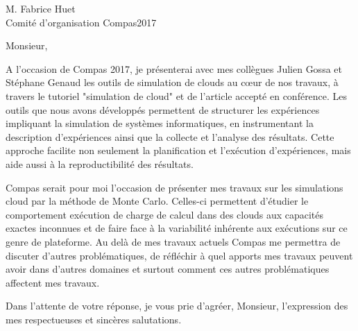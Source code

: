 \documentclass{letter}
\begin{document}
\begin{letter}{M. Fabrice Huet \\ Comité d'organisation Compas2017}

\opening{Monsieur,}

A l'occasion de  Compas 2017, je présenterai avec mes  collègues Julien Gossa et
Stéphane Genaud les outils de simulation de clouds au c\oe{}ur de nos travaux, à
travers le tutoriel "simulation de cloud" et de l'article accepté en conférence.
Les outils  que nous avons  développés permettent de structurer  les expériences
impliquant  la  simulation  de   systèmes  informatiques,  en  instrumentant  la
description   d'expériences   ainsi   que   la   collecte   et   l'analyse   des
résultats. Cette approche facilite non seulement la planification et l'exécution
d'expériences, mais aide aussi à la reproductibilité des résultats.

	Compas serait pour moi l'occasion de présenter mes travaux sur les
	simulations cloud par la méthode de Monte Carlo. Celles-ci permettent
	d'étudier le comportement exécution de charge de calcul dans des clouds
	aux capacités exactes inconnues et de faire face à la variabilité
	inhérente aux exécutions sur ce genre de plateforme. Au delà de mes
	travaux actuels Compas me permettra de discuter d'autres problématiques,
	de réfléchir à quel apports mes travaux peuvent avoir dans d'autres
	domaines et surtout comment ces autres problématiques affectent mes
	travaux.




\closing{Dans l'attente de votre réponse, je vous prie d'agréer, Monsieur,
l'expression des mes respectueuses et sincères salutations.}


\end{letter}
\end{document}
